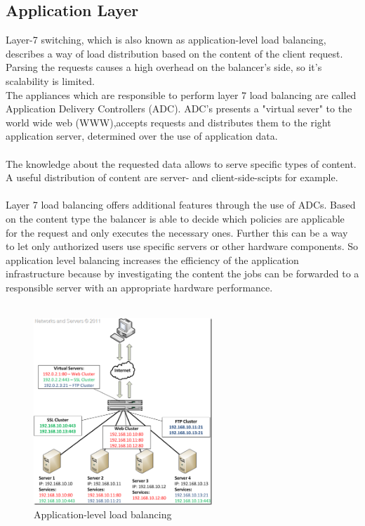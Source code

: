 \documentclass[12p]{article}
\begin{document}
	\subsection{Application Layer}
	Layer-7 switching, which is also known as application-level load balancing, describes a way of load distribution based on the content of the client request. Parsing the requests causes a high overhead on the balancer's side, so it's scalability is limited.\\
	The appliances which are responsible to perform layer 7 load balancing are called Application Delivery Controllers (\gls{ADC}). \gls{ADC}'s presents a "virtual sever" to the world wide web (\gls{WWW}),accepts requests and distributes them to the right application server, determined over the use of application data.\\
	\\
	The knowledge about the requested data allows to serve specific types of content. A useful distribution of content are server- and client-side-scipts for example.\\
	\\
	Layer 7 load balancing offers additional features through the use of \gls{ADC}s. Based on the content type the balancer is able to decide which policies are applicable for the request and only executes the necessary ones. Further this can be a way to let only authorized users use specific servers or other hardware components. So application level balancing increases the efficiency of the application infrastructure because by investigating the content the jobs can be forwarded to a responsible server with an appropriate hardware performance. \cite{AppLayerBalancing}\\
	\\
	\begin{figure}[h!]
		\centering
		\includegraphics[width=0.6\textwidth]{img/lSevenLB.png}
		\caption{Application-level load balancing \cite{AppLayerBalancing}}
	\end{figure}\\\\
	
\end{document}
